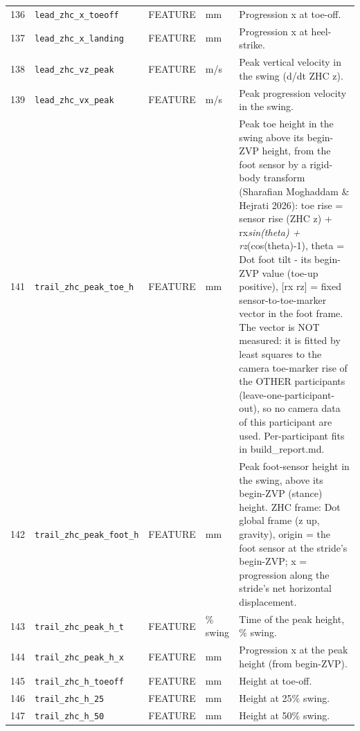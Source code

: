 \begin{longtable}{@{}r p{3.6cm} p{1.55cm} p{1.15cm} p{8.6cm}@{}}
136 & \texttt{lead\_\allowbreak{}zhc\_\allowbreak{}x\_\allowbreak{}toeoff} & FEATURE & mm & Progression x at toe-off. \\
137 & \texttt{lead\_\allowbreak{}zhc\_\allowbreak{}x\_\allowbreak{}landing} & FEATURE & mm & Progression x at heel-strike. \\
138 & \texttt{lead\_\allowbreak{}zhc\_\allowbreak{}vz\_\allowbreak{}peak} & FEATURE & m/s & Peak vertical velocity in the swing (d/dt ZHC z). \\
139 & \texttt{lead\_\allowbreak{}zhc\_\allowbreak{}vx\_\allowbreak{}peak} & FEATURE & m/s & Peak progression velocity in the swing. \\
141 & \texttt{trail\_\allowbreak{}zhc\_\allowbreak{}peak\_\allowbreak{}toe\_\allowbreak{}h} & FEATURE & mm & Peak toe height in the swing above its begin-ZVP height, from the foot sensor by a rigid-body transform (Sharafian Moghaddam \& Hejrati 2026): toe rise = sensor rise (ZHC z) + rx\emph{sin(theta) + rz}(cos(theta)-1), theta = Dot foot tilt - its begin-ZVP value (toe-up positive), [rx rz] = fixed sensor-to-toe-marker vector in the foot frame. The vector is NOT measured: it is fitted by least squares to the camera toe-marker rise of the OTHER participants (leave-one-participant-out), so no camera data of this participant are used. Per-participant fits in build\_report.md. \\
142 & \texttt{trail\_\allowbreak{}zhc\_\allowbreak{}peak\_\allowbreak{}foot\_\allowbreak{}h} & FEATURE & mm & Peak foot-sensor height in the swing, above its begin-ZVP (stance) height. ZHC frame: Dot global frame (z up, gravity), origin = the foot sensor at the stride's begin-ZVP; x = progression along the stride's net horizontal displacement. \\
143 & \texttt{trail\_\allowbreak{}zhc\_\allowbreak{}peak\_\allowbreak{}h\_\allowbreak{}t} & FEATURE & \% swing & Time of the peak height, \% swing. \\
144 & \texttt{trail\_\allowbreak{}zhc\_\allowbreak{}peak\_\allowbreak{}h\_\allowbreak{}x} & FEATURE & mm & Progression x at the peak height (from begin-ZVP). \\
145 & \texttt{trail\_\allowbreak{}zhc\_\allowbreak{}h\_\allowbreak{}toeoff} & FEATURE & mm & Height at toe-off. \\
146 & \texttt{trail\_\allowbreak{}zhc\_\allowbreak{}h\_\allowbreak{}25} & FEATURE & mm & Height at 25\% swing. \\
147 & \texttt{trail\_\allowbreak{}zhc\_\allowbreak{}h\_\allowbreak{}50} & FEATURE & mm & Height at 50\% swing. \\

\end{longtable}
